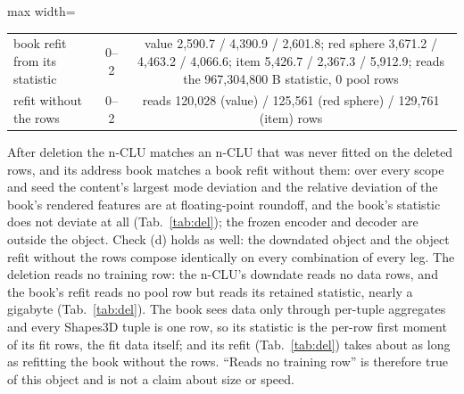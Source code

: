\documentclass{article} %
\begin{document}
\begin{table}[t]
\begin{adjustbox}{max width=\linewidth}
\begin{tabular}{lccccccc}
book refit from its statistic & 0--2 & \multicolumn{6}{p{10.6cm}}{value 2,590.7 / 4,390.9 / 2,601.8; red sphere 3,671.2 / 4,463.2 / 4,066.6; item 5,426.7 / 2,367.3 / 5,912.9; reads the 967,304,800 B statistic, 0 pool rows} \\
refit without the rows & 0--2 & \multicolumn{6}{p{10.6cm}}{reads 120,028 (value) / 125,561 (red sphere) / 129,761 (item) rows} \\
\bottomrule
\end{tabular}\end{adjustbox}
\end{table}

\noindent After deletion the n-CLU matches an n-CLU that was never fitted on the deleted rows, and its address
book matches a book refit without them: over every scope and seed the content's largest mode
deviation and the relative deviation of the book's rendered features are at floating-point roundoff, and the book's statistic does not deviate
at all (Tab.~\ref{tab:del}); the frozen encoder and decoder are outside the object. Check (d)
holds as well: the downdated object and the object refit without the rows compose identically on every
combination of every leg.
 The deletion reads no training row: the n-CLU's downdate reads no data rows, and the %
book's refit reads no pool row but reads its retained statistic, nearly a gigabyte (Tab.~\ref{tab:del}). The book sees %
data only through per-tuple aggregates and every Shapes3D tuple is one row, so its statistic is the
per-row first moment of its fit rows, the fit data itself; and its refit (Tab.~\ref{tab:del}) takes %
about as long as refitting the book without the rows. ``Reads no training row'' is %
therefore true of this object and is not a claim about size or speed.
\end{document}
